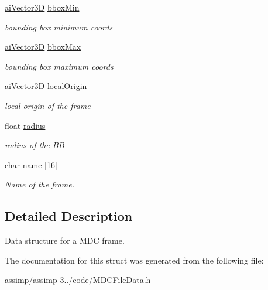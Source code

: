 \begin{DoxyCompactItemize}
\item 
\hypertarget{struct_assimp_1_1_m_d_c_1_1_frame_afefe302bf39cb3defd24389fcfe4f30b}{\hyperlink{structai_vector3_d}{ai\+Vector3\+D} \hyperlink{struct_assimp_1_1_m_d_c_1_1_frame_afefe302bf39cb3defd24389fcfe4f30b}{bbox\+Min}}\label{struct_assimp_1_1_m_d_c_1_1_frame_afefe302bf39cb3defd24389fcfe4f30b}

\begin{DoxyCompactList}\small\item\em bounding box minimum coords \end{DoxyCompactList}\item 
\hypertarget{struct_assimp_1_1_m_d_c_1_1_frame_a69e5b8d0de9fa94abed153f087490aae}{\hyperlink{structai_vector3_d}{ai\+Vector3\+D} \hyperlink{struct_assimp_1_1_m_d_c_1_1_frame_a69e5b8d0de9fa94abed153f087490aae}{bbox\+Max}}\label{struct_assimp_1_1_m_d_c_1_1_frame_a69e5b8d0de9fa94abed153f087490aae}

\begin{DoxyCompactList}\small\item\em bounding box maximum coords \end{DoxyCompactList}\item 
\hypertarget{struct_assimp_1_1_m_d_c_1_1_frame_a945f1915a68c4a5603e437f2c7da2059}{\hyperlink{structai_vector3_d}{ai\+Vector3\+D} \hyperlink{struct_assimp_1_1_m_d_c_1_1_frame_a945f1915a68c4a5603e437f2c7da2059}{local\+Origin}}\label{struct_assimp_1_1_m_d_c_1_1_frame_a945f1915a68c4a5603e437f2c7da2059}

\begin{DoxyCompactList}\small\item\em local origin of the frame \end{DoxyCompactList}\item 
\hypertarget{struct_assimp_1_1_m_d_c_1_1_frame_a1f9e4020f77f1164ccea1d8526cc31f1}{float \hyperlink{struct_assimp_1_1_m_d_c_1_1_frame_a1f9e4020f77f1164ccea1d8526cc31f1}{radius}}\label{struct_assimp_1_1_m_d_c_1_1_frame_a1f9e4020f77f1164ccea1d8526cc31f1}

\begin{DoxyCompactList}\small\item\em radius of the B\+B \end{DoxyCompactList}\item 
\hypertarget{struct_assimp_1_1_m_d_c_1_1_frame_a5d3d96518c2fee2a9590950f9cc3c0e8}{char \hyperlink{struct_assimp_1_1_m_d_c_1_1_frame_a5d3d96518c2fee2a9590950f9cc3c0e8}{name} \mbox{[}16\mbox{]}}\label{struct_assimp_1_1_m_d_c_1_1_frame_a5d3d96518c2fee2a9590950f9cc3c0e8}

\begin{DoxyCompactList}\small\item\em Name of the frame. \end{DoxyCompactList}\end{DoxyCompactItemize}


\subsection{Detailed Description}
Data structure for a M\+D\+C frame. 

The documentation for this struct was generated from the following file\+:\begin{DoxyCompactItemize}
\item 
assimp/assimp-\/3../code/M\+D\+C\+File\+Data.\+h\end{DoxyCompactItemize}
